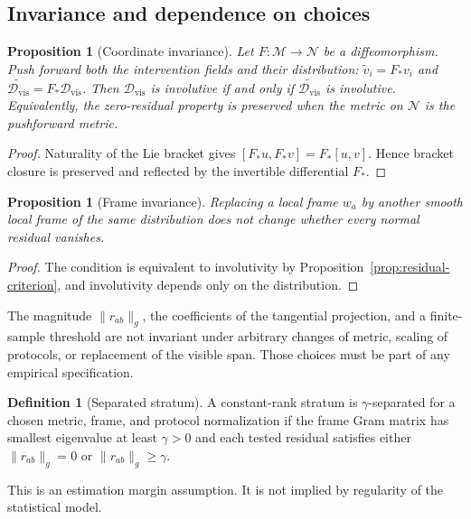 \documentclass{article}
\theoremstyle{plain}
\newtheorem{proposition}[theorem]{Proposition}
\theoremstyle{definition}
\newtheorem{definition}[theorem]{Definition}
\theoremstyle{remark}
\newcommand{\M}{\mathcal M}
\newcommand{\Dvis}{\mathcal D_{\mathrm{vis}}}
\begin{document}
\subsection{Invariance and dependence on choices}

\begin{proposition}[Coordinate invariance]
\label{prop:coordinate}
Let \(F:\M\to\mathcal N\) be a diffeomorphism.  Push forward both the
intervention fields and their distribution:
\(\widetilde v_i=F_*v_i\) and
\(\widetilde{\Dvis}=F_*\Dvis\).  Then \(\Dvis\) is involutive if and only if
\(\widetilde{\Dvis}\) is involutive.  Equivalently, the zero-residual property is
preserved when the metric on \(\mathcal N\) is the pushforward metric.
\end{proposition}

\begin{proof}
Naturality of the Lie bracket gives
\([F_*u,F_*v]=F_*[u,v]\).  Hence bracket closure is preserved and reflected by
the invertible differential \(F_*\).
\end{proof}

\begin{proposition}[Frame invariance]
Replacing a local frame \(w_a\) by another smooth local frame of the same
distribution does not change whether every normal residual vanishes.
\end{proposition}

\begin{proof}
The condition is equivalent to involutivity by
Proposition~\ref{prop:residual-criterion}, and involutivity depends only on the
distribution.
\end{proof}

The magnitude \(\|r_{ab}\|_g\), the coefficients of the tangential projection,
and a finite-sample threshold are not invariant under arbitrary changes of
metric, scaling of protocols, or replacement of the visible span.  Those
choices must be part of any empirical specification.

\begin{definition}[Separated stratum]
A constant-rank stratum is \(\gamma\)-separated for a chosen metric, frame, and
protocol normalization if the frame Gram matrix has smallest eigenvalue at
least \(\gamma>0\) and each tested residual satisfies either
\(\|r_{ab}\|_g=0\) or \(\|r_{ab}\|_g\ge\gamma\).
\end{definition}

This is an estimation margin assumption.  It is not implied by regularity of
the statistical model.
\end{document}
